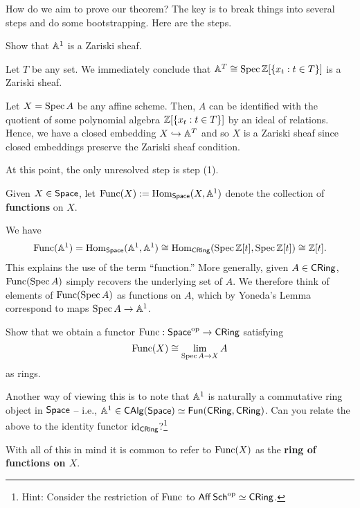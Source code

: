 \documentclass[11pt]{article}
\begin{document}
How do we aim to prove our theorem? The key is to break things into several steps and do some bootstrapping. Here are the steps.
\begin{enum}{\arabic}
\item Show that $\mathbb{A}^1$ is a Zariski sheaf.

\item Let $T$ be any set. We immediately conclude that $\mathbb{A}^T\cong\operatorname{Spec}\mathbb{Z}[\{x_t : t\in T\}]$ is a Zariski sheaf.

\item Let $X=\operatorname{Spec} A$ be any affine scheme. Then, $A$ can be identified with the quotient of some polynomial algebra $\mathbb{Z}[\{x_t : t\in T\}]$ by an ideal of relations. Hence, we have a closed embedding $X\hookrightarrow\mathbb{A}^T$ and so $X$ is a Zariski sheaf since closed embeddings preserve the Zariski sheaf condition.
\end{enum}

At this point, the only unresolved step is step \textup{(1)}.

\begin{definition}
Given $X\in\operatorname{\mathsf{Space}}$, let $\operatorname{Func}(X):=\operatorname{Hom}_{\operatorname{\mathsf{Space}}}(X,\mathbb{A}^1)$ denote the collection of \textbf{functions} on $X$.
\end{definition}

\begin{example}
We have 
\begin{align*}
\operatorname{Func}(\mathbb{A}^1)
=\operatorname{Hom}_{\operatorname{\mathsf{Space}}}(\mathbb{A}^1,\mathbb{A}^1)
\cong\operatorname{Hom}_{\operatorname{\mathsf{CRing}}}(\operatorname{Spec}\mathbb{Z}[t],\operatorname{Spec}\mathbb{Z}[t])
\cong\mathbb{Z}[t].
\end{align*}
This explains the use of the term ``function.'' More generally, given $A\in\operatorname{\mathsf{CRing}}$, $\operatorname{Func}(\operatorname{Spec} A)$ simply recovers the underlying set of $A$. We therefore think of elements of $\operatorname{Func}(\operatorname{Spec} A)$ as functions on $A$, which by Yoneda's Lemma correspond to maps $\operatorname{Spec} A\to\mathbb{A}^1$.
\end{example}

\begin{exercise}
\hfill
\begin{enum}{\alph}
\item Show that we obtain a functor $\operatorname{Func}: \operatorname{\mathsf{Space}}^{\operatorname{op}}\to\operatorname{\mathsf{CRing}}$ satisfying
$$\operatorname{Func}(X)\cong\lim_{\operatorname{Spec} A\to X}A$$
as rings.

\item Another way of viewing this is to note that $\mathbb{A}^1$ is naturally a commutative ring object in $\operatorname{\mathsf{Space}}$ -- i.e., $\mathbb{A}^1\in\operatorname{\mathsf{CAlg}}(\operatorname{\mathsf{Space}})\simeq\operatorname{\mathsf{Fun}}(\operatorname{\mathsf{CRing}},\operatorname{\mathsf{CRing}})$. Can you relate the above to the identity functor $\operatorname{id}_{\operatorname{\mathsf{CRing}}}$?\footnote{Hint: Consider the restriction of $\operatorname{Func}$ to $\operatorname{\mathsf{Aff}}\operatorname{\mathsf{Sch}}^{\operatorname{op}}\simeq\operatorname{\mathsf{CRing}}$.}
\end{enum}
With all of this in mind it is common to refer to $\operatorname{Func}(X)$ as the \textbf{ring of functions on $X$}.
\end{exercise}
\end{document}

